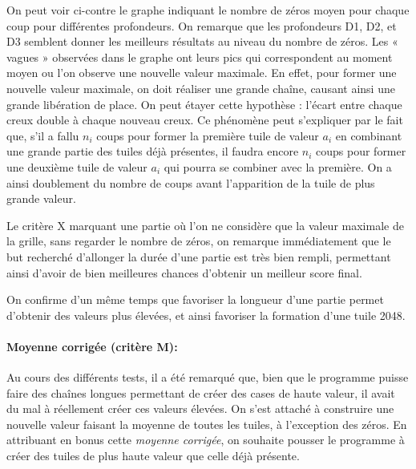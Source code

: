 \documentclass[a4paper]{report}
\begin{document}
On peut voir ci-contre le graphe indiquant le nombre de zéros moyen pour chaque coup pour différentes profondeurs.
On remarque que les profondeurs D1, D2, et D3 semblent donner les meilleurs résultats au niveau du nombre de zéros. Les « vagues » observées dans le graphe ont leurs pics qui correspondent au moment moyen ou l’on observe une nouvelle valeur maximale. En effet, pour former une nouvelle valeur maximale, on doit réaliser une grande chaîne, causant ainsi une grande libération de place. On peut étayer cette hypothèse : l'écart entre chaque creux double à chaque nouveau creux. Ce phénomène peut s'expliquer par le fait que, s'il a fallu $n_i$ coups pour former la première tuile de valeur $a_i$ en combinant une grande partie des tuiles déjà présentes, il faudra encore $n_i$ coups pour former une deuxième tuile de valeur $a_i$ qui pourra se combiner avec la première. On a ainsi doublement du nombre de coups avant l'apparition de la tuile de plus grande valeur.

Le critère X marquant une partie où l’on ne considère que la valeur maximale de la grille, sans regarder le nombre de zéros, on remarque immédiatement que le but recherché d’allonger la durée d’une partie est très bien rempli, permettant ainsi d’avoir de bien meilleures chances d’obtenir un meilleur score final.

\begin{figure}[h!]
\null\hfill
{}
\hfill
{}
\hfill\null
\end{figure}

On confirme d’un même temps que favoriser la longueur d’une partie permet d’obtenir des valeurs plus élevées, et ainsi favoriser la formation d’une tuile 2048.




\paragraph{Moyenne corrigée (critère M):}

Au cours des différents tests, il a été remarqué que, bien que le programme puisse faire des chaînes longues permettant de créer des cases de haute valeur, il avait du mal à réellement créer ces valeurs élevées. On s'est attaché à construire une nouvelle valeur faisant la moyenne de toutes les tuiles, à l'exception des zéros. En attribuant en bonus cette \emph{moyenne corrigée}, on souhaite pousser le programme à créer des tuiles de plus haute valeur que celle déjà présente.
\end{document}
